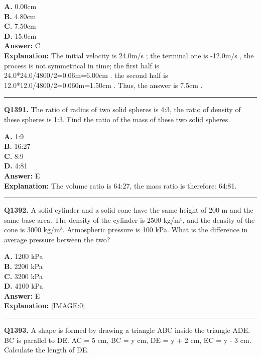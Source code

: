 \documentclass[12pt]{article}
\begin{document}
\textbf{A.} 0.00cm \\
\textbf{B.} 4.80cm \\
\textbf{C.} 7.50cm \\
\textbf{D.} 15.0cm \\

\textbf{Answer:} C \\
\textbf{Explanation:} The initial velocity is 24.0m/s
; the terminal one is -12.0m/s
, the process is not symmetrical in time;
the first half is 24.0*24.0/4800/2=0.06m=6.00cm
.
the second half is 12.0*12.0/4800/2=0.060m=1.50cm
.
Thus, the answer is 7.5cm
.

\hrule
\vspace{1em}


\noindent
\textbf{Q1391.} The ratio of radius of two solid spheres is 4:3, the ratio of density of these spheres is 1:3. Find the ratio of the mass of these two solid spheres.



\textbf{A.} 1:9 \\
\textbf{B.} 16:27 \\
\textbf{C.} 8:9 \\
\textbf{D.} 4:81 \\

\textbf{Answer:} E \\
\textbf{Explanation:} The volume ratio is 64:27, the mass ratio is therefore: 64:81.

\hrule
\vspace{1em}


\noindent
\textbf{Q1392.} A solid cylinder and a solid cone have the same height of 200 m and the same base area. The density of the cylinder is 2500 kg/m³, and the density of the cone is 3000 kg/m³. Atmospheric pressure is 100 kPa. What is the difference in average pressure between the two?



\textbf{A.} 1200 kPa \\
\textbf{B.} 2200 kPa \\
\textbf{C.} 3200 kPa \\
\textbf{D.} 4100 kPa \\

\textbf{Answer:} E \\
\textbf{Explanation:} [IMAGE:0]

\hrule
\vspace{1em}


\noindent
\textbf{Q1393.} A shape is formed by drawing a triangle ABC inside the triangle ADE.
BC is parallel to DE. AC = 5 cm, BC = y cm, DE = y + 2 cm, EC = y - 3 cm.
Calculate the length of DE.
\end{document}
